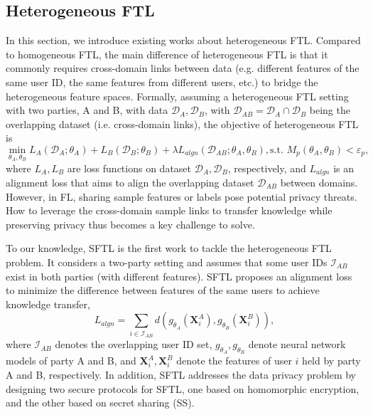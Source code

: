 \documentclass[11pt]{article}
\begin{document}
\subsection{Heterogeneous FTL}
In this section, we introduce existing works about heterogeneous FTL. Compared to homogeneous FTL, the main difference of heterogeneous FTL is that it commonly requires cross-domain links between data (e.g. different features of the same user ID, the same features from different users, etc.) to bridge the heterogeneous feature spaces. Formally, assuming a heterogeneous FTL setting with two parties, A and B, with data $\mathcal{D}_A, \mathcal{D}_B$, with $\mathcal{D}_{AB}=\mathcal{D}_A\cap \mathcal{D}_B$ being the overlapping dataset (i.e. cross-domain links), the objective of heterogeneous FTL is
\begin{equation}
    \min_{\theta_A, \theta_B} L_{A}(\mathcal{D}_A;\theta_A) + L_B(\mathcal{D}_B;\theta_B) + \lambda L_{algn}(\mathcal{D}_{AB};\theta_A, \theta_B), \text{s.t. } M_p(\theta_A, \theta_B)< \varepsilon_p,
\end{equation}
where $L_A, L_B$ are loss functions on dataset $\mathcal{D}_A, \mathcal{D}_B$, respectively, and $L_{algn}$ is an alignment loss that aims to align the overlapping dataset $\mathcal{D}_{AB}$ between domains. However, in FL, sharing sample features or labels pose potential privacy threats. How to leverage the cross-domain sample links to transfer knowledge while preserving privacy thus becomes a key challenge to solve.

To our knowledge, SFTL \cite{Yilun-liu2020secure} is the first work to tackle the heterogeneous FTL problem. It considers a two-party setting and assumes that some user IDs $\mathcal{I}_{AB}$ exist in both parties (with different features). SFTL proposes an alignment loss to minimize the difference between features of the same users to achieve knowledge transfer,
\begin{equation}
    L_{algn} = \sum_{i\in\mathcal{I}_{AB}}d(g_{\theta_A}(\mathbf{X}_i^A), g_{\theta_B}(\mathbf{X}_i^B)),
\end{equation}
where $\mathcal{I}_{AB}$ denotes the overlapping user ID set, $g_{\theta_A}, g_{\theta_B}$ denote neural network models of party A and B, and $\mathbf{X}_i^A, \mathbf{X}_i^B$ denote the features of user $i$ held by party A and B, respectively. In addition, SFTL addresses the data privacy problem by designing two secure protocols for SFTL, one based on homomorphic encryption, and the other based on secret sharing (SS).
\end{document}

